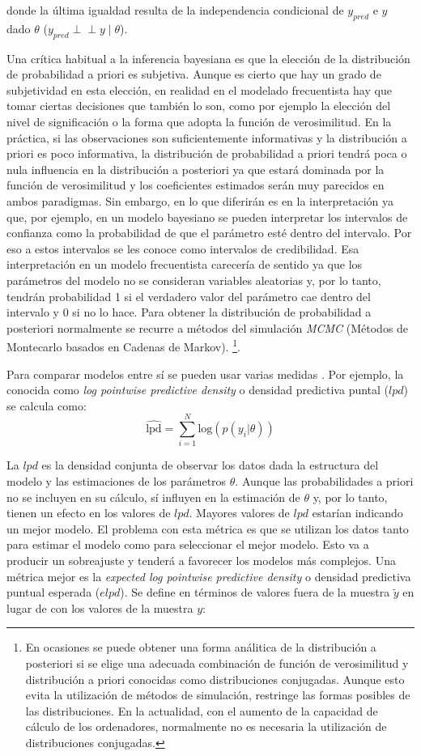 \documentclass[
  12pt,
  a4paper,
  extrafontsizes,
  onecolumn,
  openright,
  table]{memoir}
\begin{document}
donde la última igualdad resulta de la independencia condicional de
\(y_{pred}\) e \(y\) dado \(\theta\)
(\(y_{pred} \perp\!\!\!\perp y \mid \theta\)).

Una crítica habitual a la inferencia bayesiana es que la elección de la
distribución de probabilidad a priori es subjetiva. Aunque es cierto que
hay un grado de subjetividad en esta elección, en realidad en el
modelado frecuentista hay que tomar ciertas decisiones que también lo
son, como por ejemplo la elección del nivel de significación o la forma
que adopta la función de verosimilitud. En la práctica, si las
observaciones son suficientemente informativas y la distribución a
priori es poco informativa, la distribución de probabilidad a priori
tendrá poca o nula influencia en la distribución a posteriori ya que
estará dominada por la función de verosimilitud y los coeficientes
estimados serán muy parecidos en ambos paradigmas. Sin embargo, en lo
que diferirán es en la interpretación ya que, por ejemplo, en un modelo
bayesiano se pueden interpretar los intervalos de confianza como la
probabilidad de que el parámetro esté dentro del intervalo. Por eso a
estos intervalos se les conoce como intervalos de credibilidad. Esa
interpretación en un modelo frecuentista carecería de sentido ya que los
parámetros del modelo no se consideran variables aleatorias y, por lo
tanto, tendrán probabilidad 1 si el verdadero valor del parámetro cae
dentro del intervalo y 0 si no lo hace. Para obtener la distribución de
probabilidad a posteriori normalmente se recurre a métodos del
simulación \emph{\gls{MCMC}} (Métodos de Montecarlo basados en Cadenas
de Markov). \footnote{En ocasiones se puede obtener una forma análitica
  de la distribución a posteriori si se elige una adecuada combinación
  de función de verosimilitud y distribución a priori conocidas como
  distribuciones conjugadas. Aunque esto evita la utilización de métodos
  de simulación, restringe las formas posibles de las distribuciones. En
  la actualidad, con el aumento de la capacidad de cálculo de los
  ordenadores, normalmente no es necesaria la utilización de
  distribuciones conjugadas.}.

Para comparar modelos entre sí se pueden usar varias medidas
\autocite[ver][]{barreda2023}. Por ejemplo, la conocida como \emph{log
pointwise predictive density} o densidad predictiva puntal (\(lpd\)) se
calcula como: \[
\widehat{\mathrm{lpd}} = \sum_{i=1}^{N} \mathrm{log} (p(y_{i} | \theta))
\]

La \(lpd\) es la densidad conjunta de observar los datos dada la
estructura del modelo y las estimaciones de los parámetros \(\theta\).
Aunque las probabilidades a priori no se incluyen en su cálculo, sí
influyen en la estimación de \(\theta\) y, por lo tanto, tienen un
efecto en los valores de \(lpd\). Mayores valores de \(lpd\) estarían
indicando un mejor modelo. El problema con esta métrica es que se
utilizan los datos tanto para estimar el modelo como para seleccionar el
mejor modelo. Esto va a producir un sobreajuste y tenderá a favorecer
los modelos más complejos. Una métrica mejor es la \emph{expected log
pointwise predictive density} o densidad predictiva puntual esperada
(\(elpd\)). Se define en términos de valores fuera de la muestra
\(\tilde{y}\) en lugar de con los valores de la muestra \(y\):
\end{document}

